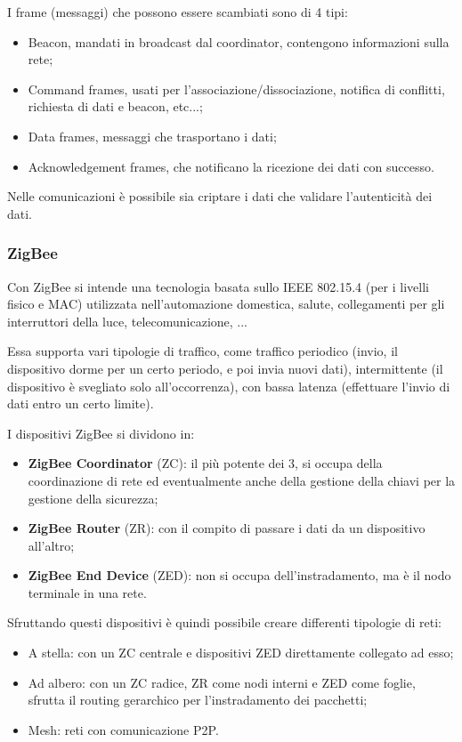 I frame (messaggi) che possono essere scambiati sono di 4 tipi:
\begin{itemize}
  \item Beacon, mandati in broadcast dal coordinator, contengono informazioni
        sulla rete;
  \item Command frames, usati per l'associazione/dissociazione, notifica di
        conflitti, richiesta di dati e beacon, etc...;
  \item Data frames, messaggi che trasportano i dati;
  \item Acknowledgement frames, che notificano la ricezione dei dati con successo.
\end{itemize}

Nelle comunicazioni è possibile sia criptare i dati che validare l'autenticità
dei dati.

\subsubsection{ZigBee}
Con ZigBee si intende una tecnologia basata sullo IEEE 802.15.4 (per i livelli
fisico e MAC) utilizzata nell'automazione domestica, salute, collegamenti per
gli interruttori della luce, telecomunicazione, ...

Essa supporta vari tipologie di traffico, come traffico periodico (invio, il
dispositivo dorme per un certo periodo, e poi invia nuovi dati), intermittente
(il dispositivo è svegliato solo all'occorrenza), con bassa latenza (effettuare
 l'invio di dati entro un certo limite).

I dispositivi ZigBee si dividono in:
\begin{itemize}
  \item \textbf{ZigBee Coordinator} (ZC): il più potente dei 3, si occupa della
        coordinazione di rete ed eventualmente anche della gestione della chiavi
        per la gestione della sicurezza;
  \item \textbf{ZigBee Router} (ZR): con il compito di passare i dati da un
        dispositivo all'altro;
  \item \textbf{ZigBee End Device} (ZED): non si occupa dell'instradamento, ma è
        il nodo terminale in una rete.
\end{itemize}

Sfruttando questi dispositivi è quindi possibile creare differenti tipologie di
reti:
\begin{itemize}
  \item A stella: con un ZC centrale e dispositivi ZED direttamente collegato ad
        esso;
  \item Ad albero: con un ZC radice, ZR come nodi interni e ZED come foglie,
        sfrutta il routing gerarchico per l'instradamento dei pacchetti;
  \item Mesh: reti con comunicazione P2P.
\end{itemize}


